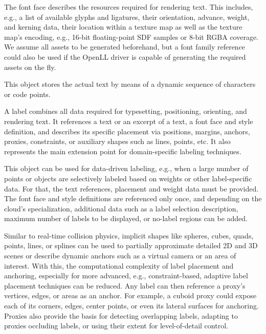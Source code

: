 \begin{description}\setlength{\itemsep}{8pt}

	\item [Font Face]
	The font face describes the resources required for rendering text. This includes, e.g., a list of available glyphs and ligatures, their orientation, advance, weight, and kerning data, their location within a texture map as well as the texture map's encoding, e.g., 16-bit floating-point SDF samples or 8-bit RGBA coverage.
	We assume all assets to be generated beforehand, but a font family reference could also be used if the OpenLL driver is capable of generating the required assets on the fly. 
	
	\item [Text]
	This object stores the actual text by means of a dynamic sequence of characters or code points.
	
	\item [Label]
	A label combines all data required for typesetting, positioning, orienting, and rendering text.
	It references a text or an excerpt of a text, a font face and style definition, and describes its specific placement via positions, margins, anchors, proxies, constraints, or auxiliary shapes such as lines, points, etc.
	It also represents the main extension point for domain-specific labeling techniques.
	
	\item [Label Cloud]
	This object can be used for data-driven labeling, e.g., when a large number of points or objects are selectively labeled based on weights or other label-specific data.
	For that, the text references, placement and weight data must be provided. 
	The font face and style definitions are referenced only once, and depending on the cloud's specialization, additional data such as a label selection description, maximum number of labels to be displayed, or no-label regions can be added.

	\item [Proxy]
	Similar to real-time collision physics, implicit shapes like spheres, cubes, quads, points, lines, or splines can be used to partially approximate detailed 2D and 3D scenes or describe dynamic anchors such as a virtual camera or an area of interest.
	With this, the computational complexity of label placement and anchoring, especially for more advanced, e.g., constraint-based, adaptive label placement techniques can be reduced.
	Any label can then reference a proxy's vertices, edges, or areas as an anchor. 
	For example, a cuboid proxy could expose each of its corners, edges, center points, or even its lateral surfaces for anchoring. 
	Proxies also provide the basis for detecting overlapping labels, adapting to proxies occluding labels, or using their extent for level-of-detail control.


\end{description}

